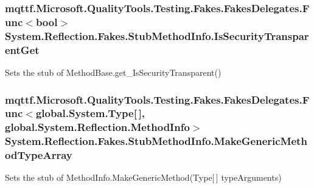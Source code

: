 \hypertarget{class_system_1_1_reflection_1_1_fakes_1_1_stub_method_info_a091f5e9aff7ec68affae347c9143781b}{
\subsubsection[{Is\-Security\-Transparent\-Get}]{\setlength{\rightskip}{0pt plus 5cm}mqttf.\-Microsoft.\-Quality\-Tools.\-Testing.\-Fakes.\-Fakes\-Delegates.\-Func$<$bool$>$ System.\-Reflection.\-Fakes.\-Stub\-Method\-Info.\-Is\-Security\-Transparent\-Get}}\label{class_system_1_1_reflection_1_1_fakes_1_1_stub_method_info_a091f5e9aff7ec68affae347c9143781b}


Sets the stub of Method\-Base.\-get\-\_\-\-Is\-Security\-Transparent()

\hypertarget{class_system_1_1_reflection_1_1_fakes_1_1_stub_method_info_aacbbe857295038f3b757a1841e0b7a75}{
\subsubsection[{Make\-Generic\-Method\-Type\-Array}]{\setlength{\rightskip}{0pt plus 5cm}mqttf.\-Microsoft.\-Quality\-Tools.\-Testing.\-Fakes.\-Fakes\-Delegates.\-Func$<$global.\-System.\-Type\mbox{[}$\,$\mbox{]}, global.\-System.\-Reflection.\-Method\-Info$>$ System.\-Reflection.\-Fakes.\-Stub\-Method\-Info.\-Make\-Generic\-Method\-Type\-Array}}\label{class_system_1_1_reflection_1_1_fakes_1_1_stub_method_info_aacbbe857295038f3b757a1841e0b7a75}


Sets the stub of Method\-Info.\-Make\-Generic\-Method(\-Type\mbox{[}$\,$\mbox{]} type\-Arguments)

